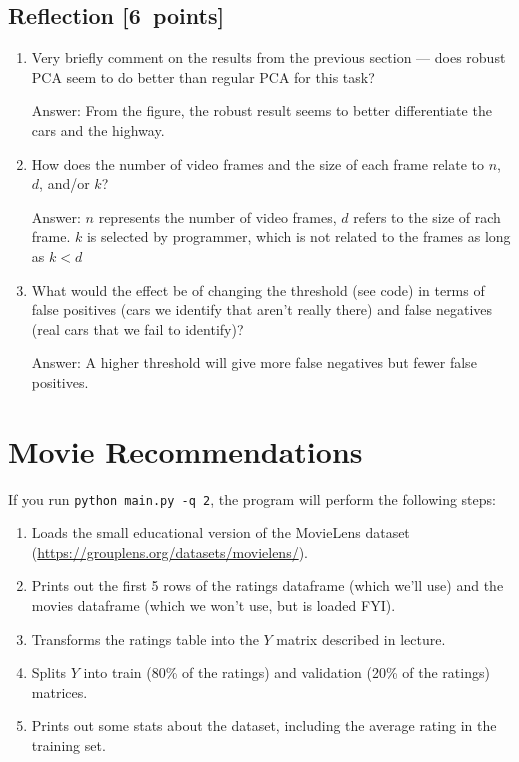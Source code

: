 \documentclass{article}
\newenvironment{answer}{\par\begingroup\color{gre}Answer: }{\endgroup}
\newcommand\pts[1]{\textcolor{pointscolour}{[#1~points]}}
\begin{document}
\subsection{Reflection \pts{6}}

\begin{enumerate}
	\item Very briefly comment on the results from the previous section --- does robust PCA seem to do better than regular PCA for this task?
	\begin{answer}
		From the figure, the robust result seems to better differentiate the cars and the highway.
	\end{answer}
	\item How does the number of video frames and the size of each frame relate to $n$, $d$, and/or $k$?
	\begin{answer}
		$n$ represents the number of video frames, $d$ refers to the size of rach frame. $k$ is selected by programmer, which is not related to the frames as long as $k < d$ 
	\end{answer}
	\item What would the effect be of changing the threshold (see code) in terms of false positives (cars we identify that aren't really there) and false negatives (real cars that we fail to identify)?
	\begin{answer}
		A higher threshold will give more false negatives but fewer false positives.
	\end{answer}
\end{enumerate}


\clearpage
\section{Movie Recommendations}

If you run \texttt{python main.py -q 2}, the program will perform the following steps:

\begin{enumerate}
\item Loads the small educational version of the MovieLens dataset (\url{https://grouplens.org/datasets/movielens/}).

\item Prints out the first 5 rows of the ratings dataframe (which we'll use) and the movies dataframe (which we won't use, but is loaded FYI).

\item Transforms the ratings table into the $Y$ matrix described in lecture.

\item Splits $Y$ into train (80\% of the ratings) and validation (20\% of the ratings) matrices.

\item Prints out some stats about the dataset, including the average rating in the training set.

\end{enumerate}
\end{document}
